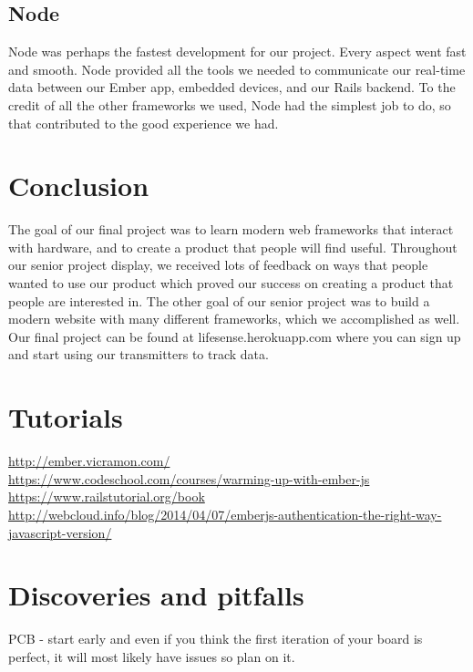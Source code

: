 \documentclass[letterpaper, 12 pt]{article}
\begin{document}
\subsection{Node}
Node was perhaps the fastest development for our project. Every aspect went fast and smooth. Node provided all the tools we needed to communicate our real-time data between our Ember app, embedded devices, and our Rails backend. To the credit of all the other frameworks we used, Node had the simplest job to do, so that contributed to the good experience we had. 

\section{Conclusion}
The goal of our final project was to learn modern web frameworks that interact with hardware, and to create a product that people will find useful. Throughout our senior project display, we received lots of feedback on ways that people wanted to use our product which proved our success on creating a product that people are interested in. The other goal of our senior project was to build a modern website with many different frameworks, which we accomplished as well. Our final project can be found at lifesense.herokuapp.com where you can sign up and start using our transmitters to track data. 







\clearpage


\newpage
\appendices

\section{Tutorials}
\url{http://ember.vicramon.com/} \\
\url{https://www.codeschool.com/courses/warming-up-with-ember-js} \\
\url{https://www.railstutorial.org/book} \\
\url{http://webcloud.info/blog/2014/04/07/emberjs-authentication-the-right-way-javascript-version/}


\section{Discoveries and pitfalls}

PCB - start early and even if you think the first iteration of your board is perfect, it will most likely have issues so plan on it. 
\end{document}
